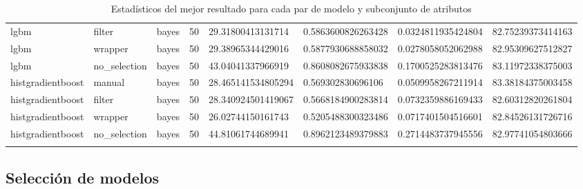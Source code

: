 {\begin{longtable}[c]{@{}llllllll@{}}
	\rowcolor[HTML]{EFEFEF} 
	lgbm               & filter        & bayes      & 50  & 29.31800413131714      & 0.5863600826263428     & 0.0324811935424804     & 82.75239373414163  \\
	lgbm               & wrapper       & bayes      & 50  & 29.38965344429016      & 0.5877930688858032     & 0.0278058052062988     & 82.95309627512827  \\
	\rowcolor[HTML]{EFEFEF} 
	lgbm               & no\_selection & bayes      & 50  & 43.04041337966919      & 0.8608082675933838     & 0.1700525283813476     & 83.11972338375003  \\* \midrule
	histgradientboost  & manual        & bayes      & 50  & 28.465141534805294     & 0.569302830696106      & 0.0509958267211914     & 83.38184375003458  \\
	\rowcolor[HTML]{EFEFEF} 
	histgradientboost  & filter        & bayes      & 50  & 28.340924501419067     & 0.5668184900283814     & 0.0732359886169433     & 82.60312820261804  \\
	histgradientboost  & wrapper       & bayes      & 50  & 26.02744150161743      & 0.5205488300323486     & 0.0717401504516601     & 82.84526131726716  \\
	\rowcolor[HTML]{EFEFEF} 
	histgradientboost  & no\_selection & bayes      & 50  & 44.81061744689941      & 0.8962123489379883     & 0.2714483737945556     & 82.97741054803666  \\* \bottomrule
	\captionsetup{justification=centering}
	\caption{Estadísticos del mejor resultado para cada par de modelo y subconjunto de atributos}
	\label{tab:annextrainingresults}\\
\end{longtable}}

\subsection{Selección de modelos}

